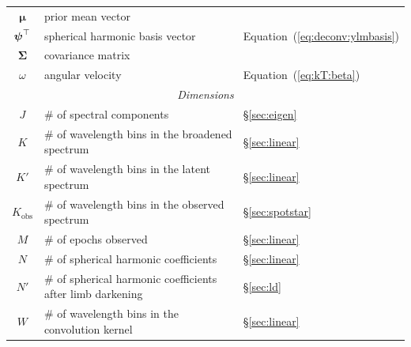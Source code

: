 \documentclass[modern]{aastex631}
\begin{document}
\begin{center}
\begin{longtable}{cll}
        $\boldsymbol{\mu}$                                  & prior mean vector                                            &                                            \\
        $\boldsymbol{\psi}^\top$                                         & spherical harmonic basis vector                              & Equation~(\ref{eq:deconv:ylmbasis})        \\
        $\boldsymbol{\Sigma}$                               & covariance matrix                                            &                                            \\
        $\omega$                                            & angular velocity                                             & Equation~(\ref{eq:kT:beta})                \\
        \midrule
        \multicolumn{3}{c}{\emph{Dimensions}}                                                                                                                           \\
        \midrule
        $J$                                                 & \# of spectral components                                    & \S\ref{sec:eigen}                          \\
        $K$                                                 & \# of wavelength bins in the broadened spectrum              & \S\ref{sec:linear}                         \\
        $K'$                                                & \# of wavelength bins in the latent spectrum                 & \S\ref{sec:linear}                         \\
        $K_\mathrm{obs}$                                    & \# of wavelength bins in the observed spectrum               & \S\ref{sec:spotstar}                       \\
        $M$                                                 & \# of epochs observed                                        & \S\ref{sec:linear}                         \\
        $N$                                                 & \# of spherical harmonic coefficients                        & \S\ref{sec:linear}                         \\
        $N'$                                                & \# of spherical harmonic coefficients after limb darkening   & \S\ref{sec:ld}                             \\
        $W$                                                 & \# of wavelength bins in the convolution kernel              & \S\ref{sec:linear}                         \\

\end{longtable}
\end{center}
\end{document}
